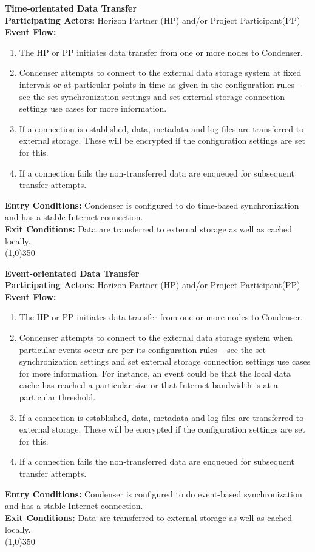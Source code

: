 		\textbf{Time-orientated Data Transfer}\\	 
		\textbf{Participating Actors:} Horizon Partner (HP) and/or Project Participant(PP) \\
		\textbf{Event Flow:}
		\begin{enumerate}
\item The HP or PP initiates data transfer from one or more nodes to Condenser.
\item Condenser attempts to connect to the external data storage system at fixed intervals or at particular points in time as given in the configuration rules -- see the set synchronization settings and set external storage connection settings use cases for more information.
\item If a connection is established, data, metadata and  log files are transferred to external storage. These will be encrypted if the configuration settings are set for this.
\item If a connection fails the non-transferred data are enqueued for subsequent transfer attempts.
	    \end{enumerate}
		\textbf{Entry Conditions:} Condenser is configured to do time-based synchronization and has a stable Internet connection.\\
		\textbf{Exit Conditions:} Data are transferred to external storage as well as cached locally.\\
		\line(1,0){350}		
		
		\textbf{Event-orientated Data Transfer}\\	  
		\textbf{Participating Actors:} Horizon Partner (HP) and/or Project Participant(PP) \\
		\textbf{Event Flow:}
		\begin{enumerate}
\item The HP or PP initiates data transfer from one or more nodes to Condenser.
\item Condenser attempts to connect to the external data storage system when particular events occur are per its configuration rules -- see the set synchronization settings and set external storage connection settings use cases for more information. For instance, an event could be that the local data cache has reached a particular size or that Internet bandwidth is at a particular threshold.
\item If a connection is established, data, metadata and  log files are transferred to external storage. These will be encrypted if the configuration settings are set for this.
\item If a connection fails the non-transferred data are enqueued for subsequent transfer attempts.
	    \end{enumerate}
		\textbf{Entry Conditions:} Condenser is configured to do event-based synchronization and has a stable Internet connection.\\
		\textbf{Exit Conditions:} Data are transferred to external storage as well as cached locally.\\
		\line(1,0){350}		
		
